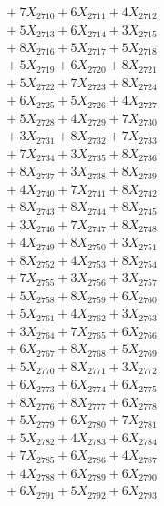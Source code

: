 \documentclass[a4paper,10pt]{article}
\begin{document}
{\begin{align}
&\;  + 7 X_{2710} + 6 X_{2711} + 4 X_{2712} \\[0.3ex]
&\;  + 5 X_{2713} + 6 X_{2714} + 3 X_{2715} \\[0.3ex]
&\;  + 8 X_{2716} + 5 X_{2717} + 5 X_{2718} \\[0.3ex]
&\;  + 5 X_{2719} + 6 X_{2720} + 8 X_{2721} \\[0.3ex]
&\;  + 5 X_{2722} + 7 X_{2723} + 8 X_{2724} \\[0.3ex]
&\;  + 6 X_{2725} + 5 X_{2726} + 4 X_{2727} \\[0.3ex]
&\;  + 5 X_{2728} + 4 X_{2729} + 7 X_{2730} \\[0.3ex]
&\;  + 3 X_{2731} + 8 X_{2732} + 7 X_{2733} \\[0.3ex]
&\;  + 7 X_{2734} + 3 X_{2735} + 8 X_{2736} \\[0.3ex]
&\;  + 8 X_{2737} + 3 X_{2738} + 8 X_{2739} \\[0.5ex]\allowbreak
&\;  + 4 X_{2740} + 7 X_{2741} + 8 X_{2742} \\[0.3ex]
&\;  + 8 X_{2743} + 8 X_{2744} + 8 X_{2745} \\[0.3ex]
&\;  + 3 X_{2746} + 7 X_{2747} + 8 X_{2748} \\[0.3ex]
&\;  + 4 X_{2749} + 8 X_{2750} + 3 X_{2751} \\[0.3ex]
&\;  + 8 X_{2752} + 4 X_{2753} + 8 X_{2754} \\[0.3ex]
&\;  + 7 X_{2755} + 3 X_{2756} + 3 X_{2757} \\[0.3ex]
&\;  + 5 X_{2758} + 8 X_{2759} + 6 X_{2760} \\[0.3ex]
&\;  + 5 X_{2761} + 4 X_{2762} + 3 X_{2763} \\[0.3ex]
&\;  + 3 X_{2764} + 7 X_{2765} + 6 X_{2766} \\[0.3ex]
&\;  + 6 X_{2767} + 8 X_{2768} + 5 X_{2769} \\[0.5ex]\allowbreak
&\;  + 5 X_{2770} + 8 X_{2771} + 3 X_{2772} \\[0.3ex]
&\;  + 6 X_{2773} + 6 X_{2774} + 6 X_{2775} \\[0.3ex]
&\;  + 8 X_{2776} + 8 X_{2777} + 6 X_{2778} \\[0.3ex]
&\;  + 5 X_{2779} + 6 X_{2780} + 7 X_{2781} \\[0.3ex]
&\;  + 5 X_{2782} + 4 X_{2783} + 6 X_{2784} \\[0.3ex]
&\;  + 7 X_{2785} + 6 X_{2786} + 4 X_{2787} \\[0.3ex]
&\;  + 4 X_{2788} + 6 X_{2789} + 6 X_{2790} \\[0.3ex]
&\;  + 6 X_{2791} + 5 X_{2792} + 6 X_{2793} \\[0.3ex]

\end{align}}
\end{document}
